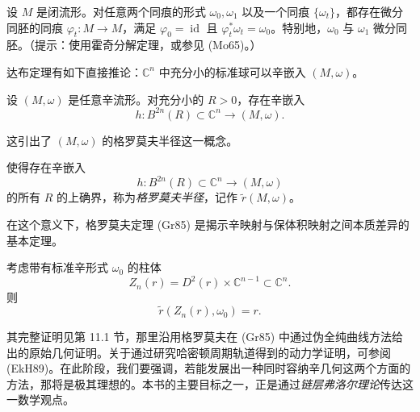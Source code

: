 \begin{exercise}[莫泽]
\label{ex:moser-isotopy}
设 $M$ 是闭流形。对任意两个同痕的形式 $\omega_0,\omega_1$ 以及一个同痕 $\{\omega_t\}$，都存在微分同胚的同痕 $\varphi_t:M\to M$，满足
$\varphi_0=\operatorname{id}$ 且 $\varphi_t^*\omega_t=\omega_0$。特别地，$\omega_0$ 与 $\omega_1$ 微分同胚。（提示：使用霍奇分解定理，或参见 (Mo65)。）
\end{exercise}

达布定理有如下直接推论：$\mathbb C^n$ 中充分小的标准球可以辛嵌入 $(M,\omega)$。

\begin{corollary}
\label{cor:small-symplectic-ball}
设 $(M,\omega)$ 是任意辛流形。对充分小的 $R>0$，存在辛嵌入
\[
  h:B^{2n}(R)\subset\mathbb C^n\longrightarrow(M,\omega).
\]
\end{corollary}

这引出了 $(M,\omega)$ 的格罗莫夫半径这一概念。

\begin{definition}
\label{def:gromov-radius}
使得存在辛嵌入
\[
  h:B^{2n}(R)\subset\mathbb C^n\longrightarrow(M,\omega)
\]
的所有 $R$ 的上确界，称为\emph{格罗莫夫半径}，记作 $\widetilde r(M,\omega)$。
\end{definition}

在这个意义下，格罗莫夫定理 (Gr85) 是揭示辛映射与保体积映射之间本质差异的基本定理。

\begin{theorem}[格罗莫夫非挤压定理]
\label{thm:gromov-nonsqueezing}
考虑带有标准辛形式 $\omega_0$ 的柱体
\[
  Z_n(r)=D^2(r)\times\mathbb C^{n-1}\subset\mathbb C^n.
\]
则
\[
  \widetilde r(Z_n(r),\omega_0)=r.
\]
\end{theorem}

其完整证明见第 11.1 节，那里沿用格罗莫夫在 (Gr85) 中通过伪全纯曲线方法给出的原始几何证明。关于通过研究哈密顿周期轨道得到的动力学证明，可参阅 (EkH89)。在此阶段，我们要强调，若能发展出一种同时容纳辛几何这两个方面的方法，那将是极其理想的。本书的主要目标之一，正是通过\emph{链层弗洛尔理论}传达这一数学观点。
